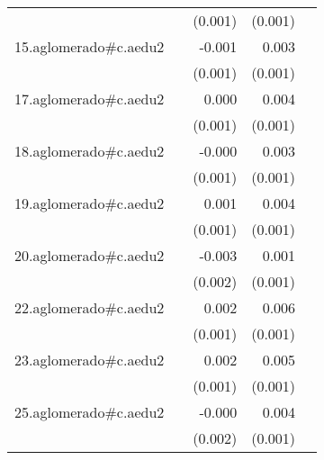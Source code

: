 {\begin{longtable}{l*{4}{D{.}{.}{-1}}}
            &                     &     (0.001)         &     (0.001)         &                     \\
\addlinespace
15.aglomerado#c.aedu2&                     &      -0.001         &       0.003\sym{**} &                     \\
            &                     &     (0.001)         &     (0.001)         &                     \\
\addlinespace
17.aglomerado#c.aedu2&                     &       0.000         &       0.004\sym{***}&                     \\
            &                     &     (0.001)         &     (0.001)         &                     \\
\addlinespace
18.aglomerado#c.aedu2&                     &      -0.000         &       0.003\sym{**} &                     \\
            &                     &     (0.001)         &     (0.001)         &                     \\
\addlinespace
19.aglomerado#c.aedu2&                     &       0.001         &       0.004\sym{***}&                     \\
            &                     &     (0.001)         &     (0.001)         &                     \\
\addlinespace
20.aglomerado#c.aedu2&                     &      -0.003         &       0.001         &                     \\
            &                     &     (0.002)         &     (0.001)         &                     \\
\addlinespace
22.aglomerado#c.aedu2&                     &       0.002         &       0.006\sym{***}&                     \\
            &                     &     (0.001)         &     (0.001)         &                     \\
\addlinespace
23.aglomerado#c.aedu2&                     &       0.002         &       0.005\sym{***}&                     \\
            &                     &     (0.001)         &     (0.001)         &                     \\
\addlinespace
25.aglomerado#c.aedu2&                     &      -0.000         &       0.004\sym{**} &                     \\
            &                     &     (0.002)         &     (0.001)         &                     \\

\end{longtable}}
